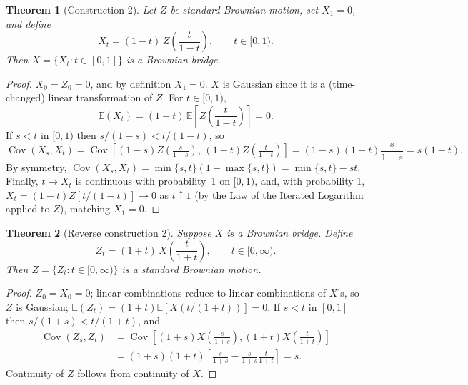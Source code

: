 \documentclass[12pt,openany]{book}
\newtheorem{theorem}{Theorem}[section]
\theoremstyle{definition}
\theoremstyle{remark}
\newcommand{\E}{\mathbb{E}}
\DeclareMathOperator{\Cov}{Cov}
\begin{document}
\begin{theorem}[Construction 2]
Let $Z$ be standard Brownian motion, set $X_1=0$, and define
\begin{equation}
    X_t = (1-t)\,Z\!\left(\frac{t}{1-t}\right), \qquad t\in[0,1). \tag{18.3.1}
\end{equation}
Then $X = \{X_t : t\in[0,1]\}$ is a Brownian bridge.
\end{theorem}
\begin{proof}
$X_0=Z_0=0$, and by definition $X_1=0$. $X$ is Gaussian since it is a (time-changed) linear transformation of $Z$. For $t\in[0,1)$,
\begin{equation}
    \E(X_t) = (1-t)\,\E\!\left[Z\!\left(\frac{t}{1-t}\right)\right] = 0. \tag{18.3.2}
\end{equation}
If $s<t$ in $[0,1)$ then $s/(1-s) < t/(1-t)$, so
\begin{equation}
    \Cov(X_s,X_t) = \Cov\!\left[(1-s)Z\!\left(\tfrac{s}{1-s}\right),\, (1-t)Z\!\left(\tfrac{t}{1-t}\right)\right] = (1-s)(1-t)\frac{s}{1-s} = s(1-t). \tag{18.3.3}
\end{equation}
By symmetry, $\Cov(X_s,X_t) = \min\{s,t\}(1-\max\{s,t\}) = \min\{s,t\} - st$. Finally, $t\mapsto X_t$ is continuous with probability~1 on $[0,1)$, and, with probability 1, $X_t = (1-t)Z[t/(1-t)] \to 0$ as $t\uparrow 1$ (by the Law of the Iterated Logarithm applied to $Z$), matching $X_1=0$.
\end{proof}
 
\begin{theorem}[Reverse construction 2]
Suppose $X$ is a Brownian bridge. Define
\begin{equation}
    Z_t = (1+t)\,X\!\left(\frac{t}{1+t}\right), \qquad t\in[0,\infty). \tag{18.3.4}
\end{equation}
Then $Z = \{Z_t : t\in[0,\infty)\}$ is a standard Brownian motion.
\end{theorem}
\begin{proof}
$Z_0=X_0=0$; linear combinations reduce to linear combinations of $X$'s, so $Z$ is Gaussian; $\E(Z_t) = (1+t)\E[X(t/(1+t))]=0$. If $s<t$ in $[0,1]$ then $s/(1+s)<t/(1+t)$, and
\begin{equation}
    \begin{aligned}
    \Cov(Z_s,Z_t)
    &=\Cov\!\left[(1+s)X\!\left(\tfrac{s}{1+s}\right),
                  (1+t)X\!\left(\tfrac{t}{1+t}\right)\right]\\
    &=(1+s)(1+t)
      \left[\frac{s}{1+s}-\frac{s}{1+s}\frac{t}{1+t}\right]
      =s.
    \end{aligned}
    \tag{18.3.6}
\end{equation}
Continuity of $Z$ follows from continuity of $X$.
\end{proof}
 
\end{document}
